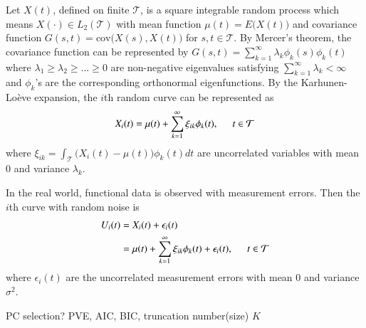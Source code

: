 \documentclass[eng]{csam}
\begin{document}
Let $X(t)$, defined on finite $\mathcal{T}$, is a square integrable random process which means $X(\cdot) \in L_2(\mathcal{T})$ with mean function $\mu(t) = E\big(X(t)\big)$ and covariance function $G(s,t) = \text{cov}\big(X(s),X(t)\big)$ for $s, t \in \mathcal{T}$.
By Mercer's theorem, the covariance function can be represented by $G(s,t) = \sum_{k=1}^\infty \lambda_k \phi_k(s) \phi_k(t)$ where $\lambda_1 \ge \lambda_2 \ge \dots \ge 0 $ are non-negative eigenvalues satisfying $\sum_{k=1}^\infty \lambda_k < \infty$ and $\phi_k$'s are the corresponding orthonormal eigenfunctions.
By the Karhunen-Lo\`{e}ve expansion, the $i$th random curve can be represented as
\begin{equation}
X_i(t) = \mu(t) + \sum_{k=1}^\infty \xi_{ik} \phi_k(t), \hspace{0.5cm} t \in \mathcal{T}
\end{equation}
where $\xi_{ik} = \int_{\mathcal{T}} \big( X_i(t) - \mu(t) \big)\phi_k(t) dt $ are uncorrelated variables with mean 0 and variance $\lambda_k$.

In the real world, functional data is observed with measurement errors. Then the $i$th curve with random noise is 
\begin{align}
U_i(t) &= X_i(t) + \epsilon_i(t) \nonumber \\
&= \mu(t) + \sum_{k=1}^\infty \xi_{ik} \phi_k(t) + \epsilon_i(t), \hspace{0.5cm} t \in \mathcal{T}
\end{align}
where $\epsilon_i(t)$ are the uncorrelated measurement errors with mean 0 and variance $\sigma^2$.

{\color{red}
	PC selection? PVE, AIC, BIC, truncation number(size) $K$
}
\end{document}
